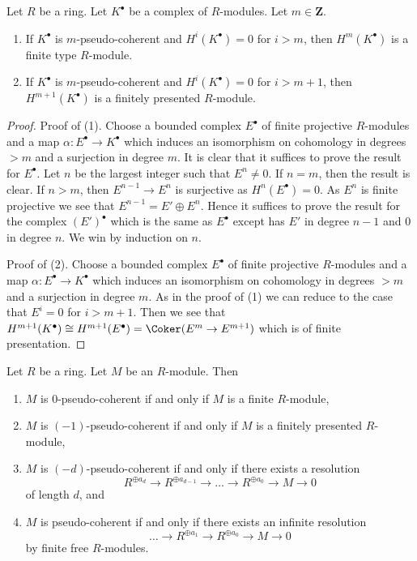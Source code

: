 \begin{lemma}
\label{lemma-finite-cohomology}
Let $R$ be a ring. Let $K^\bullet$ be a complex of $R$-modules.
Let $m \in \mathbf{Z}$.
\begin{enumerate}
\item If $K^\bullet$ is $m$-pseudo-coherent and $H^i(K^\bullet) = 0$
for $i > m$, then $H^m(K^\bullet)$ is a finite type $R$-module.
\item If $K^\bullet$ is $m$-pseudo-coherent and $H^i(K^\bullet) = 0$
for $i > m + 1$, then $H^{m + 1}(K^\bullet)$ is a finitely presented
$R$-module.
\end{enumerate}
\end{lemma}

\begin{proof}
Proof of (1). Choose a bounded complex $E^\bullet$ of finite projective
$R$-modules and a map $\alpha : E^\bullet \to K^\bullet$ which induces
an isomorphism on cohomology in degrees $> m$ and a surjection in degree $m$.
It is clear that it suffices to prove the result for $E^\bullet$.
Let $n$ be the largest integer such that $E^n \not = 0$.
If $n = m$, then the result is clear.
If $n > m$, then $E^{n - 1} \to E^n$ is surjective as
$H^n(E^\bullet) = 0$. As $E^n$ is finite projective we see that
$E^{n - 1} = E' \oplus E^n$. Hence it suffices to prove the result
for the complex $(E')^\bullet$ which is the same as $E^\bullet$
except has $E'$ in degree $n - 1$ and $0$ in degree $n$.
We win by induction on $n$.

\medskip\noindent
Proof of (2). Choose a bounded complex $E^\bullet$ of finite projective
$R$-modules and a map $\alpha : E^\bullet \to K^\bullet$ which induces
an isomorphism on cohomology in degrees $> m$ and a surjection in degree $m$.
As in the proof of (1) we can reduce to the case that $E^i = 0$ for
$i > m + 1$. Then we see that
$H^{m + 1}(K^\bullet) \cong
H^{m + 1}(E^\bullet) = \Coker(E^m \to E^{m + 1})$
which is of finite presentation.
\end{proof}

\begin{lemma}
\label{lemma-n-pseudo-module}
Let $R$ be a ring. Let $M$ be an $R$-module.
Then
\begin{enumerate}
\item $M$ is $0$-pseudo-coherent if and only if $M$ is a finite
$R$-module,
\item $M$ is $(-1)$-pseudo-coherent if and only if $M$ is a finitely
presented $R$-module,
\item $M$ is $(-d)$-pseudo-coherent if and only if there exists a
resolution
$$
R^{\oplus a_d} \to R^{\oplus a_{d - 1}} \to \ldots \to R^{\oplus a_0} \to
M \to 0
$$
of length $d$, and
\item $M$ is pseudo-coherent if and only if there exists an
infinite resolution
$$
\ldots \to R^{\oplus a_1} \to R^{\oplus a_0} \to M \to 0
$$
by finite free $R$-modules.
\end{enumerate}
\end{lemma}

